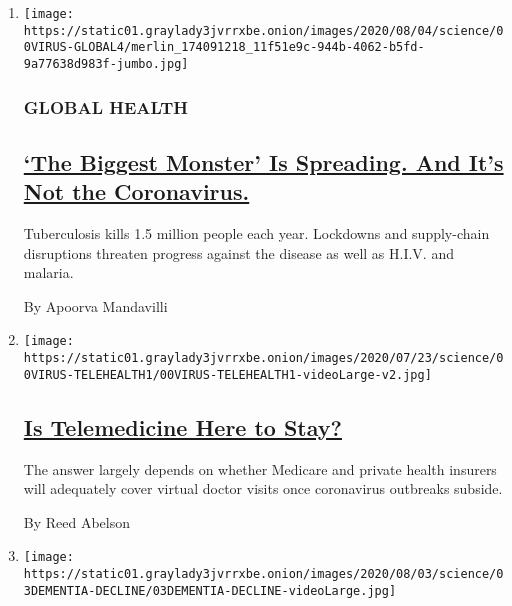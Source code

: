 \begin{enumerate}
\def\labelenumi{\arabic{enumi}.}
\item
  \texttt{[image: https://static01.graylady3jvrrxbe.onion/images/2020/08/04/science/00VIRUS-GLOBAL4/merlin\_174091218\_11f51e9c-944b-4062-b5fd-9a77638d983f-jumbo.jpg]}

  \hypertarget{global-health}{%
  \subsubsection{GLOBAL HEALTH}\label{global-health}}

  \hypertarget{the-biggest-monster-is-spreading-and-its-not-the-coronavirus}{%
  \subsection{\texorpdfstring{\href{/2020/08/03/health/coronavirus-tuberculosis-aids-malaria.html}{`The
  Biggest Monster' Is Spreading. And It's Not the
  Coronavirus.}}{`The Biggest Monster' Is Spreading. And It's Not the Coronavirus.}}\label{the-biggest-monster-is-spreading-and-its-not-the-coronavirus}}

  Tuberculosis kills 1.5 million people each year. Lockdowns and
  supply-chain disruptions threaten progress against the disease as well
  as H.I.V. and malaria.

  By Apoorva Mandavilli
\item
  \texttt{[image: https://static01.graylady3jvrrxbe.onion/images/2020/07/23/science/00VIRUS-TELEHEALTH1/00VIRUS-TELEHEALTH1-videoLarge-v2.jpg]}

  \hypertarget{is-telemedicine-here-to-stay}{%
  \subsection{\texorpdfstring{\href{/2020/08/03/health/covid-telemedicine-congress.html}{Is
  Telemedicine Here to
  Stay?}}{Is Telemedicine Here to Stay?}}\label{is-telemedicine-here-to-stay}}

  The answer largely depends on whether Medicare and private health
  insurers will adequately cover virtual doctor visits once coronavirus
  outbreaks subside.

  By Reed Abelson
\item
  \texttt{[image: https://static01.graylady3jvrrxbe.onion/images/2020/08/03/science/03DEMENTIA-DECLINE/03DEMENTIA-DECLINE-videoLarge.jpg]}

  \hypertarget{dementia-on-the-retreat-in-the-us-and-europe}{%
}
\end{enumerate}
